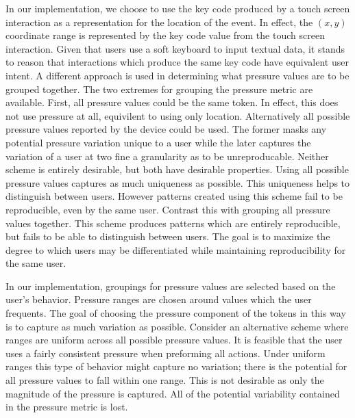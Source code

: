 In our implementation,
we choose to use the key code produced by 
a touch screen interaction as a representation 
for the location of the event.
In effect,
the $(x,y)$ coordinate range
is represented by the
key code value from the touch screen interaction.
%
Given that users use a soft keyboard to input
textual data, it stands to reason that
interactions which produce the same key code have equivalent user intent.
%
A different approach is used in determining
what pressure values are to be grouped together.
%
The two extremes for grouping the pressure metric 
are available.
First, 
all pressure values could be the same token.
In effect, this does not use pressure at all, 
equivilent to using only location.
%
Alternatively all possible pressure values reported
by the device could be used.
%
The former masks any potential pressure variation unique to a user while
the later captures the variation of a user at two fine a granularity
as to be unreproducable.
Neither scheme is entirely desirable, 
but both have desirable properties.
%
Using all possible pressure values captures
as much uniqueness as possible.
This uniqueness helps to distinguish between users.
However patterns created using this scheme
fail to be reproducible, even by the same user.
%
Contrast this with grouping all pressure values together. 
This scheme produces patterns which are entirely reproducible, but
fails to be able to distinguish between users.
%
The goal is to maximize the degree to which users
may be differentiated while maintaining
reproducibility for the same user.

In our implementation,
groupings for pressure values are selected based on the user's behavior.
Pressure ranges are chosen around values which the user frequents.
The goal of choosing 
the pressure component of the
tokens in this way is to capture
as much variation as possible.
%
Consider an alternative scheme where ranges are
uniform across all possible pressure values.
It is feasible that the user uses a fairly consistent
pressure when preforming all actions.
Under uniform ranges this type of behavior might 
capture no variation; there is the potential
for all pressure values to fall within one range.
%
This is not desirable as 
only the magnitude of the pressure is captured.
All of the potential variability contained
in the pressure metric is lost.


